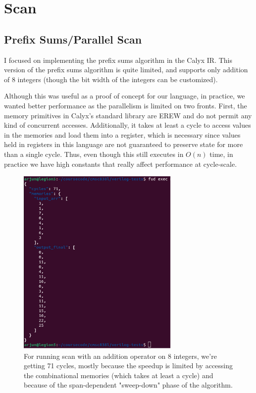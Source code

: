 \documentclass[12pt]{article}
\begin{document}
\section{Scan}
\subsection{Prefix Sums/Parallel Scan}
I focused on implementing the prefix sums algorithm in the Calyx IR. This version of the prefix
sums algorithm is quite limited, and supports only addition of 8 integers (though the bit width of the integers
can be customized).

Although this was useful as a proof of concept for our language, in practice, we wanted better performance as the parallelism
is limited on two fronts. First, the memory primitives in Calyx's standard library are EREW and do not permit
any kind of concurrent accesses. Additionally, it takes at least a cycle to access values in the memories and load
them into a register, which is necessary since values held in registers in this language are not guaranteed
to preserve state for more than a single cycle. Thus, even though this still executes in $O(n)$ time,
in practice we have high constants that really affect performance at cycle-scale.

\begin{figure}[H]
    \centering
    \includegraphics[height=25em]{images/prefix_sums.png}
    \caption{For running scan with an addition operator on 8 integers, we're getting 71 cycles, mostly because the speedup
    is limited by accessing the combinational memories (which takes at least a cycle) and because
    of the span-dependent "sweep-down" phase of the algorithm.}
\end{figure}
\end{document}
